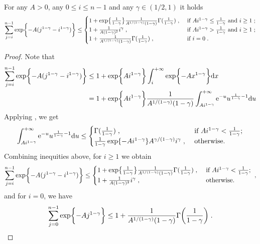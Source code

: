 \begin{lemma}
\label{lem:bound_sum_exponent}
    For any $A >0$, any $0 \leq i \leq n-1$  and any $\gamma\in(1/2, 1)$ it holds
   \begin{equation}
        \sum_{j=i}^{n-1}\exp\biggl\{-A(j^{1-\gamma} - i^{1-\gamma})\biggr\} \leq
        \begin{cases}
            1 + \exp\bigl\{\frac{1}{1-\gamma}\bigr\}\frac{1}{A^{1/(1-\gamma)}(1-\gamma)}\Gamma(\frac{1}{1-\gamma})\;, &\text{ if } Ai^{1-\gamma} \leq \frac{1}{1-\gamma} \text{ and } i \geq 1\;;\\
            1 + \frac{1}{A(1-\gamma)^2}i^\gamma\;,  &\text{ if } Ai^{1-\gamma} >\frac{1}{1-\gamma} \text{ and } i \geq 1\;;\\
            1 + \frac{1}{A^{1/(1-\gamma)}(1-\gamma)}\Gamma(\frac{1}{1-\gamma})\;, &\text{ if } i=0 \;. 
        \end{cases}
    \end{equation}
\end{lemma}
\begin{proof}
Note that 
\begin{align}
\sum_{j=i}^{n-1}\exp\biggl\{-A(j^{1-\gamma} - i^{1-\gamma})\biggr\} 
&\leq 1 +\exp\biggl\{A i^{1-\gamma}\biggr\}\int_{i}^{+\infty}\exp\biggl\{-Ax^{1-\gamma} \biggr\}\mathrm{d} x \\
&= 1 + \exp\biggl\{A i^{1-\gamma}\biggr\}\frac{1}{A^{1/(1-\gamma)}(1-\gamma)}\int_{Ai^{1-\gamma}}^{+\infty}\mathrm{e}^{-u} u^{\frac{1}{1-\gamma}-1}\mathrm{d} u
\end{align}
      Applying \cite[Theorem 4.4.3]{gabcke2015neue}, we get 
    \begin{equation}
    \int_{Ai^{1-\gamma}}^{+\infty}\mathrm{e}^{-u} u^{\frac{1}{1-\gamma}-1} \mathrm{d} u\leq
        \begin{cases}
            \Gamma(\frac{1}{1-\gamma})\;, &\text{ if } Ai^{1-\gamma} < \frac{1}{1-\gamma};\\
            \frac{1}{1-\gamma}\exp\{-Ai^{1-\gamma}\} A^{\gamma/(1-\gamma)}i^\gamma\;, &\text{ otherwise.}
        \end{cases}
    \end{equation}
    Combining inequities above, for $i \geq 1$ we obtain 
    \begin{equation}
        \sum_{j=i}^{n-1}\exp\biggl\{-A(j^{1-\gamma} - i^{1-\gamma})\biggr\} \leq
        \begin{cases}
            1 + \exp\bigl\{\frac{1}{1-\gamma}\bigr\}\frac{1}{A^{1/(1-\gamma)}(1-\gamma)}\Gamma(\frac{1}{1-\gamma})\;, &\text{ if } Ai^{1-\gamma} < \frac{1}{1-\gamma};\\
            1 + \frac{1}{A(1-\gamma)^2}i^\gamma\;, &\text{ otherwise.}
        \end{cases}
        \;,
    \end{equation}
    and for $i=0$, we have
    \begin{equation}
        \sum_{j=0}^{n-1}\exp\biggl\{-A j^{1-\gamma} \biggr\} \leq 1 + \frac{1}{A^{1/(1-\gamma)}(1-\gamma)}\Gamma\biggl(\frac{1}{1-\gamma}\biggr)\;.
    \end{equation}
\end{proof}



